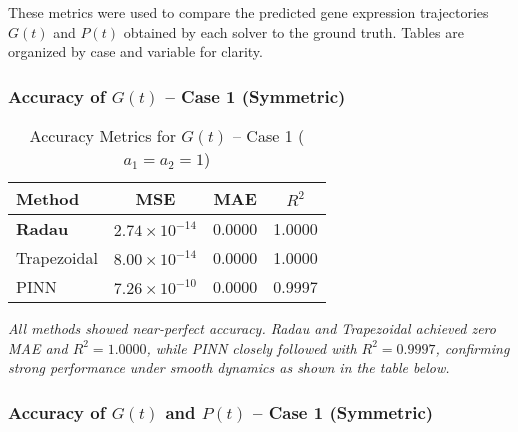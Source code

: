 \documentclass[journal]{IEEEtran}
\begin{document}
These metrics were used to compare the predicted gene expression trajectories $G(t)$ and $P(t)$ obtained by each solver to the ground truth. Tables are organized by case and variable for clarity.

\subsubsection*{Accuracy of $G(t)$ – Case 1 (Symmetric)}

\begin{table}[h!]
\centering
\caption{Accuracy Metrics for $G(t)$ – Case 1 ($a_1 = a_2 = 1$)}
\label{tab:case1_G}
\begin{tabular}{|l|c|c|c|}
\hline
\textbf{Method} & \textbf{MSE} & \textbf{MAE} & \textbf{$R^2$} \\
\hline
\textbf{Radau}        & $2.74\times10^{-14}$ & 0.0000 & 1.0000 \\
Trapezoidal  & $8.00\times10^{-14}$ & 0.0000 & 1.0000 \\
PINN         & $7.26\times10^{-10}$ & 0.0000 & 0.9997 \\
\hline
\end{tabular}
\end{table}

\vspace{0.5em}

\textit{All methods showed near-perfect accuracy. Radau and Trapezoidal achieved zero MAE and $R^2 = 1.0000$, while PINN closely followed with $R^2 = 0.9997$, confirming strong performance under smooth dynamics as shown in the table below.}


\subsubsection*{Accuracy of $G(t)$ and $P(t)$ – Case 1 (Symmetric)}
\end{document}
